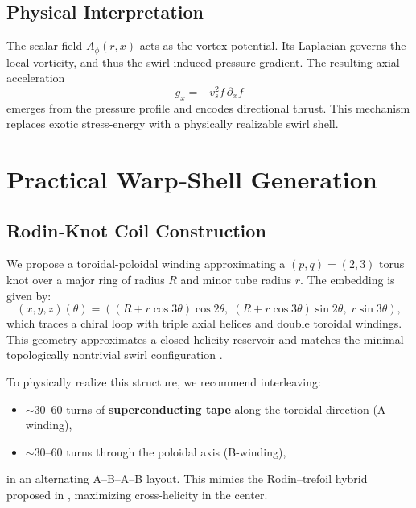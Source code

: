 \documentclass[preprint,notitlepage]{revtex4-2}
\begin{document}
    \subsection{Physical Interpretation}
    The scalar field $A_\phi(r,x)$ acts as the vortex potential. Its Laplacian governs the local vorticity, and thus the swirl‐induced pressure gradient. The resulting axial acceleration
    \begin{equation}
      g_x = -v_s^2 f \, \partial_x f
    \end{equation}
    emerges from the pressure profile and encodes directional thrust. This mechanism replaces exotic stress‐energy with a physically realizable swirl shell.

\section{Practical Warp‐Shell Generation}
    
    \subsection{Rodin‐Knot Coil Construction}
    
    We propose a toroidal-poloidal winding approximating a $(p,q) = (2,3)$ torus knot over a major ring of radius $R$ and minor tube radius $r$. The embedding is given by:
    \begin{equation}
    (x, y, z)(\theta) = \left( (R + r\cos 3\theta)\cos 2\theta,\; (R + r\cos 3\theta)\sin 2\theta,\; r\sin 3\theta \right),
    \end{equation}
    which traces a chiral loop with triple axial helices and double toroidal windings. This geometry approximates a closed helicity reservoir and matches the minimal topologically nontrivial swirl configuration \cite{VAM-10}.
    
    To physically realize this structure, we recommend interleaving:
    \begin{itemize}
        \item $\sim$30–60 turns of \textbf{superconducting tape} along the toroidal direction (A-winding),
        \item $\sim$30–60 turns through the poloidal axis (B-winding),
    \end{itemize}
    in an alternating A–B–A–B layout. This mimics the Rodin–trefoil hybrid proposed in \cite{VAM-6, VAM-10}, maximizing cross-helicity in the center.
    
\end{document}
